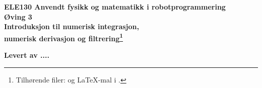 \documentclass[answers,11pt]{exam}
\begin{document}
\renewcommand{\solutiontitle}{\noindent\textbf{}\par\noindent}
\shadedsolutions
\renewcommand{\thequestion}{\alph{question})}
\renewcommand{\questionlabel}{\thequestion}
\renewcommand{\solutiontitle}{\noindent\textbf{Svar:}\par\noindent}

\renewcommand{\lstlistingname}{Kode}%
\renewcommand{\thepage}{\arabic{page}}
\cfoot{\thepage}

\pagestyle{headandfoot}
\runningheadrule       
\firstpageheader{}{}{}

\setlength{\parskip}{0.5cm}


\vspace*{2cm}

\begin{center}
  {\Large \bf ELE130 Anvendt fysikk og matematikk i robotprogrammering}\\[2cm]
  \vspace*{2cm}
  {\LARGE \bf  Øving 3\\[5mm]
    Introduksjon til
    numerisk integrasjon,\\[1mm]
    numerisk derivasjon 
    og filtrering\footnote{Tilhørende
      filer:  og {\LaTeX}-mal i . }}
\end{center}

\vspace*{3cm}
\begin{tcolorbox}
  {\Large \bf  Levert av ....}
  
\end{tcolorbox}



  
\end{document}
